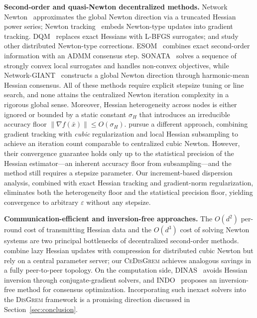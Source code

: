 \documentclass[11pt,a4paper]{article}
\def\cO{O}%
\newcommand{\cO}{\mathcal{O}}
\begin{document}
	\noindent\textbf{Second-order and quasi-Newton decentralized methods.}
	Network Newton~\citep{mokhtari2015networknewton_arxiv} approximates
	the global Newton direction via a truncated Hessian power series;
	Newton tracking~\citep{mokhtari2020newtontracking} embeds Newton-type
	updates into gradient tracking.
	DQM~\citep{eisen2017dqn} replaces exact Hessians with L-BFGS
	surrogates; \citet{bajovic2017newton} and
	\citet{zhang2021distributed} study other distributed Newton-type
	corrections.
	ESOM~\citep{mokhtari2016esom} combines exact second-order information
	with an ADMM consensus step.
	SONATA~\citep{sun2022sonata} solves a sequence of strongly convex
	local surrogates and handles non-convex objectives, while
	Network-GIANT~\citep{ye2023networkgiant} constructs a global Newton
	direction through harmonic-mean Hessian consensus.
	All of these methods require explicit stepsize tuning or line search,
	and none attains the centralized Newton iteration complexity in a
	rigorous global sense.
	Moreover, Hessian heterogeneity across nodes is either ignored or
	bounded by a static constant $\sigma_H$ that introduces an
	irreducible accuracy floor
	$\|\nabla f(\bar x)\|\le\cO(\sigma_H)$.
	\citet{daneshmand2021newton} pursue a different approach, combining
	gradient tracking with \emph{cubic} regularization and local Hessian
	subsampling to achieve an iteration count comparable to centralized
	cubic Newton.
	However, their convergence guarantee holds only up to the statistical
	precision of the Hessian estimator---an inherent accuracy floor from
	subsampling---and the method still requires a stepsize parameter.
	Our increment-based dispersion analysis, combined with
	exact Hessian tracking and gradient-norm regularization, eliminates
	both the heterogeneity floor and the statistical precision floor,
	yielding convergence to arbitrary $\varepsilon$ without any stepsize.

	\noindent\textbf{Communication-efficient and inversion-free approaches.}
	The $\cO(d^2)$ per-round cost of transmitting Hessian data and
	the $\cO(d^3)$ cost of solving Newton systems are two principal
	bottlenecks of decentralized second-order methods.
	\citet{zhang2024distributed} combine lazy Hessian updates with
	compression for distributed cubic Newton but rely on a central
	parameter server; our \textsc{CeDisGrem} achieves analogous
	savings in a fully peer-to-peer topology.
	On the computation side, DINAS~\citep{crane2025dinas} avoids
	Hessian inversion through conjugate-gradient solvers, and
	INDO~\citep{yuan2023indo} proposes an inversion-free method for
	consensus optimization.
	Incorporating such inexact solvers into the \textsc{DisGrem}
	framework is a promising direction discussed in
	Section~\ref{sec:conclusion}.
\end{document}
